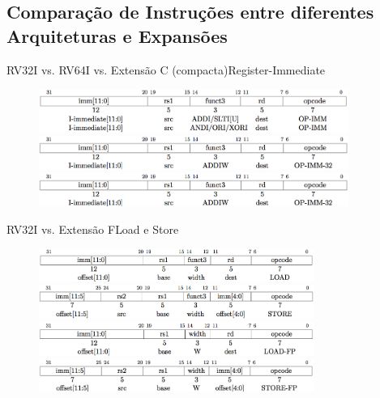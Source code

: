 \documentclass[aspectratio=169, xcolor=dvipsnames]{beamer}
\begin{document}
\subsection{Comparação de Instruções entre diferentes Arquiteturas e Expansões}
\begin{frame}{RV32I vs. RV64I vs. Extensão C (compacta)}{Register-Immediate}
	\begin{figure}
		\centering
		\label{fig:}
		\includegraphics[width=0.9\textwidth]{img/register-immediate.png}\\[0.5cm]
		\includegraphics[width=0.9\textwidth]{img/register-immediate-64.png}\\[0.5cm]
		\includegraphics[width=0.9\textwidth]{img/register-immediate-64.png}
	\end{figure}
\end{frame}

\begin{frame}{RV32I vs. Extensão F}{Load e Store}
	\begin{figure}
		\centering
		\label{fig:}
		\includegraphics[width=0.8\textwidth]{img/load.png}\\
		\includegraphics[width=0.8\textwidth]{img/store.png}\\[0.8cm]
		\includegraphics[width=0.8\textwidth]{img/load-pf.png}\\
		\includegraphics[width=0.8\textwidth]{img/store-pf.png}
	\end{figure}
\end{frame}
\end{document}
